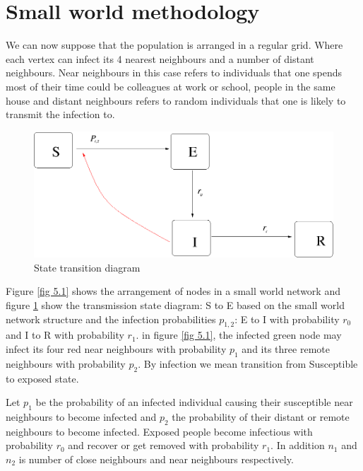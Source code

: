 \section{Small world methodology}

We  can now suppose that the population is arranged in a regular
grid.
Where each vertex can infect its 4 nearest neighbours and a number of distant neighbours. Near neighbours in this case refers to individuals that one spends most of their time could be colleagues at work or school, people in the same house and distant neighbours refers to random individuals that one is likely to transmit the infection to. 
 
 \begin{figure}[h]
 \centering
 \includegraphics[scale=0.3]{images/swseir.png}
 \caption{State transition diagram} \label{fig 5.2}
\end{figure}
 
 
 
Figure \ref{fig 5.1} shows the arrangement of nodes in a small world network and figure \ref{fig 5.2} show the transmission state diagram: S to E based on the small world network structure and the infection probabilities $p_ {1,2} $: E to I with probability $r_0$ and I to R with probability $r_1$. in figure \ref{fig 5.1}, the infected green node may infect its four red near neighbours with probability $p_1$ and its three remote neighbours with probability $p_2$. By infection we mean transition from Susceptible to exposed state.

Let $p_1$ be the probability of an infected individual causing their susceptible near neighbours to become infected and $p_2$ the probability of their distant or remote neighbours to become infected. Exposed people become infectious with probability $r_0$ and recover or get removed with probability $r_1$. In addition $n_1$ and $n_2$ is number of close neighbours and near neighbours respectively.


